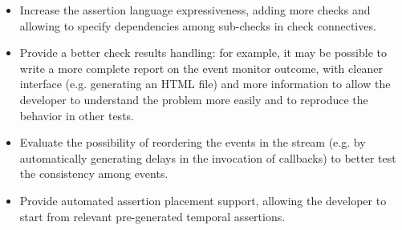 \documentclass[11pt,a4paper,notitlepage]{article}
\begin{document}
{\begin{itemize}
\begin{itemize}
		\item Increase the assertion language expressiveness, adding more checks and allowing to specify dependencies among sub-checks in check connectives.
		\item Provide a better check results handling: for example, it may be possible to write a more complete report on the event monitor outcome, with cleaner interface (e.g. generating an HTML file) and more information to allow the developer to understand the problem more easily and to reproduce the behavior in other tests.
		\item Evaluate the possibility of reordering the events in the stream (e.g. by automatically generating delays in the invocation of callbacks) to better test the consistency among events.
		\item Provide automated assertion placement support, allowing the developer to start from relevant pre-generated temporal assertions.
	\end{itemize}
\end{itemize}
}


\end{document}
